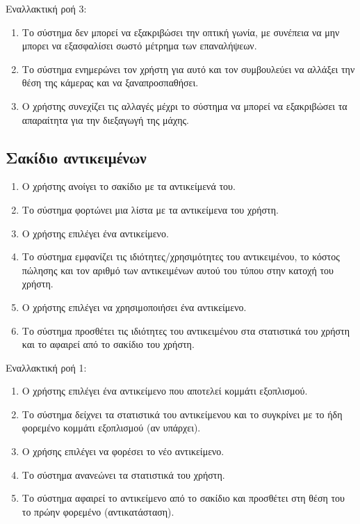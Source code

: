 Εναλλακτική ροή 3:
\begin{enumerate}[label=8.\alph*.,ref=8.\alph*]
\item Το σύστημα δεν μπορεί να εξακριβώσει την οπτική γωνία, με συνέπεια να μην μπορει να εξασφαλίσει σωστό μέτρημα των επαναλήψεων.
\item Το σύστημα ενημερώνει τον χρήστη για αυτό και τον συμβουλεύει να αλλάξει την θέση της κάμερας και να ξαναπροσπαθήσει. 
\item Ο χρήστης συνεχίζει τις αλλαγές μέχρι το σύστημα να μπορεί να εξακριβώσει τα απαραίτητα για την διεξαγωγή της μάχης.
\end{enumerate}

\newpage
\subsection{Σακίδιο αντικειμένων}
\label{sec:backpack}
\begin{enumerate}
\item Ο χρήστης ανοίγει το σακίδιο με τα αντικείμενά του.
\item Το σύστημα φορτώνει μια λίστα με τα αντικείμενα του χρήστη.
\item Ο χρήστης επιλέγει ένα αντικείμενο.
\item Το σύστημα εμφανίζει τις ιδιότητες/χρησιμότητες του αντικειμένου, το κόστος πώλησης και τον αριθμό των αντικειμένων αυτού του τύπου στην κατοχή του χρήστη.
\item Ο χρήστης επιλέγει να χρησιμοποιήσει ένα αντικείμενο.
\item Το σύστημα προσθέτει τις ιδιότητες του αντικειμένου στα στατιστικά του χρήστη και το αφαιρεί από το σακίδιο του χρήστη.
\end{enumerate}

Εναλλακτική ροή 1:
\begin{enumerate}[label=3.\alph*.,ref=3.\alph*]
\item Ο χρήστης επιλέγει ένα αντικείμενο που αποτελεί κομμάτι εξοπλισμού.
\item Το σύστημα δείχνει τα στατιστικά του αντικείμενου και το συγκρίνει με το ήδη φορεμένο κομμάτι εξοπλισμού (αν υπάρχει).
\item O χρήσης επιλέγει να φορέσει το νέο αντικείμενο.
\item Το σύστημα ανανεώνει τα στατιστικά του χρήστη.
\item Το σύστημα αφαιρεί το αντικείμενο από το σακίδιο και προσθέτει στη θέση του το πρώην φορεμένο (αντικατάσταση).
\end{enumerate}

